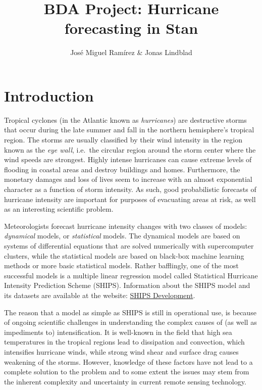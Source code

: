 \documentclass[
]{article}
\title{BDA Project: Hurricane forecasting in Stan}
\author{José Miguel Ramírez \& Jonas Lindblad}
\date{}
\begin{document}
\maketitle

{
\setcounter{tocdepth}{1}
\tableofcontents
}
\hypertarget{introduction}{%
\section{Introduction}\label{introduction}}

Tropical cyclones (in the Atlantic known as \emph{hurricanes}) are
destructive storms that occur during the late summer and fall in the
northern hemisphere's tropical region. The storms are usually classified
by their wind intensity in the region known as the \emph{eye wall},
i.e.~the circular region around the storm center where the wind speeds
are strongest. Highly intense hurricanes can cause extreme levels of
flooding in coastal areas and destroy buildings and homes. Furthermore,
the monetary damages and loss of lives seem to increase with an almost
exponential character as a function of storm intensity. As such, good
probabilistic forecasts of hurricane intensity are important for
purposes of evacuating areas at risk, as well as an interesting
scientific problem.

Meteorologists forecast hurricane intensity changes with two classes of
models: \emph{dynamical} models, or \emph{statistical} models. The
dynamical models are based on systems of differential equations that are
solved numerically with supercomputer clusters, while the statistical
models are based on black-box machine learning methods or more basic
statistical models. Rather bafflingly, one of the most successful models
is a multiple linear regression model called Statistical Hurricane
Intensity Prediction Scheme (SHIPS). Information about the SHIPS model
and its datasets are available at the website:
\href{http://rammb.cira.colostate.edu/research/tropical_cyclones/ships/index.asp}{SHIPS
Development}.

The reason that a model as simple as SHIPS is still in operational use,
is because of ongoing scientific challenges in understanding the complex
causes of (as well as impediments to) intensification. It is well-known
in the field that high sea temperatures in the tropical regions lead to
dissipation and convection, which intensifies hurricane winds, while
strong wind shear and surface drag causes weakening of the storms.
However, knowledge of these factors have not lead to a complete solution
to the problem and to some extent the issues may stem from the inherent
complexity and uncertainty in current remote sensing technology.
\end{document}
